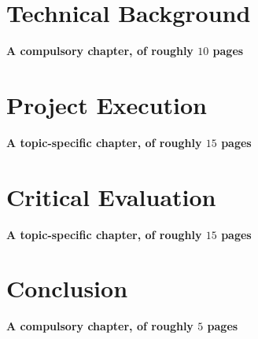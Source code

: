 \documentclass[ %
                    author={Alexander Dalton},
                supervisor={Prof. Seth Bullock},
                    degree={MEng},
                     title={Exploring Evolutionary Hardware:},
                  subtitle={Evolved Binary Arithmetic Circuits and Dynamic Problems},
                      type={research},
                      year={2018} ]{dissertation}
\begin{document}



\chapter{Technical Background}
\label{chap:technical}

{\bf \color{red}A compulsory chapter,     of roughly $10$ pages} 
\vspace{1cm} 




\chapter{Project Execution}
\label{chap:execution}

{\bf \color{red}A topic-specific chapter, of roughly $15$ pages} 
\vspace{1cm} 






\chapter{Critical Evaluation}
\label{chap:evaluation}

{\bf \color{red}A topic-specific chapter, of roughly $15$ pages} 
\vspace{1cm} 





\chapter{Conclusion}
\label{chap:conclusion}

{\bf \color{red}A compulsory chapter,     of roughly $5$ pages} 
\vspace{1cm} 



%
%
\end{document}
